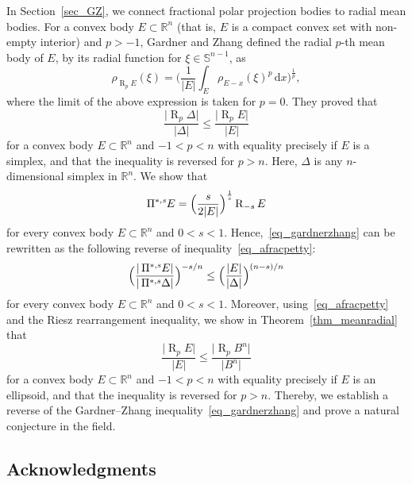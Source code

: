 \documentclass{amsart}
\newcommand{\ofpp}[1]{\operatorname{\Pi^{\ast,{\it #1}}}\!}
\newcommand{\omr}[1]{\operatorname{R}_{#1}}
\newcommand{\Bvtex}{{B^n}}
\newcommand{\Svtex}{\Delta}
\newcommand{\snvtex}{{\mathbb S}^{n-1}}
\newcommand{\dvtex}{\,\mathrm{d}}
\newcommand{\vol}[1]{ \vert #1\vert}
\begin{document}
In Section~\ref{sec_GZ}, we connect fractional polar projection bodies
to radial mean bodies. For a convex body $E\subset \mathbb R^{n}$ (that
is, $E$ is a compact convex set with non-empty interior) and $p>-1$, Gardner
and Zhang \cite{GZ} defined the radial $p$-th mean body of $E$, by its
radial function for $\xi \in \snvtex $, as
%
\begin{equation}
\rho _{\omr p E}(\xi ) = \Big(\frac {1}{\vol{E}}\int _{E} \rho _{E-x}(
\xi )^{p} \dvtex x\Big)^{\frac{1}{p}},
\nonumber \end{equation}
%
where the limit of the above expression is taken for $p=0$. They proved
that
%
\begin{equation}
\label{eq_gardnerzhang}
\frac{\vol{\omr{p} \Svtex}}{\vol{\Svtex}} \le
\frac{\vol{\omr{p} E}}{\vol{ E}}
\end{equation}
%
for a convex body $E\subset \mathbb R^{n}$ and $-1< p<n $ with equality
precisely if $E$ is a simplex, and that the inequality is reversed for
$p>n$. Here, $\Svtex $ is any $n$-dimensional simplex in $\mathbb R^{n}$. We
show that
%
\begin{equation}
\ofpp{s} E =\Big(\frac {s}{2\vol{E}}\Big)^{\frac{1}{s}} \omr {-s} E
\nonumber \end{equation}
%
for every convex body $E\subset \mathbb R^{n}$ and $0<s<1$. Hence,~\eqref{eq_gardnerzhang} can be rewritten as the following reverse of inequality~\eqref{eq_afracpetty}:
%
\begin{equation}
\Big(\frac{\vol{\ofpp{s} E}}{\vol{\ofpp{s} \Svtex}}\Big)^{- s/ n} \le
\Big(\frac{\vol{ E}}{\vol{\Svtex}}\Big)^{ {(n-s)}/n}
\nonumber \end{equation}
%
for every convex body $E\subset \mathbb R^{n}$ and $0<s<1$. Moreover, using~\eqref{eq_afracpetty} and the Riesz rearrangement inequality, we show in
Theorem~\ref{thm_meanradial} that
%
\begin{equation}
\frac{\vol{\omr{p} E}}{\vol{ E}} \le \displaystyle
\frac{\vol{\omr{p} \Bvtex}}{\vol{\Bvtex}}
\nonumber \end{equation}
%
for a convex body $E\subset \mathbb R^{n}$ and $-1<p<n$ with equality precisely
if $E$ is an ellipsoid, and that the inequality is reversed for
$p>n$. Thereby, we establish a reverse of the Gardner--Zhang inequality~\eqref{eq_gardnerzhang} and prove a natural conjecture in the field.

\subsection*{Acknowledgments}
\end{document}
